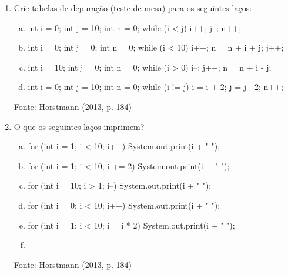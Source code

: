 \documentclass[onecolumn,a4paper,10pt]{report}
\newcommand{\+}{\, + \,}
\newcommand{\<}{\hspace*{-0.4cm}}
\begin{document}
\begin{enumerate}[1.]
\item Crie tabelas de depuração (teste de mesa) para os seguintes laços:
\begin{enumerate}[a)]
\item
\begin{javacode}
int i = 0; int j = 10; int n = 0;
while (i < j) { i++; j--; n++; }
\end{javacode}
\item
\begin{javacode}
int i = 0; int j = 0; int n = 0;
while (i < 10) { i++; n = n + i + j; j++; }
\end{javacode}
\item
\begin{javacode}
int i = 10; int j = 0; int n = 0;
while (i > 0) { i--; j++; n = n + i - j; }
\end{javacode}
\item
\begin{javacode}
int i = 0; int j = 10; int n = 0;
while (i != j) { i = i + 2; j = j - 2; n++; }
\end{javacode}
\end{enumerate}
{\tiny Fonte: Horstmann (2013, p. 184)}

\item O que os seguintes laços imprimem?
\begin{enumerate}[a)]
\item
\begin{javacode}
for (int i = 1; i < 10; i++) { System.out.print(i + " "); }
\end{javacode}
\item
\begin{javacode}
for (int i = 1; i < 10; i += 2) { System.out.print(i + " "); }
\end{javacode}
\item
\begin{javacode}
for (int i = 10; i > 1; i--) { System.out.print(i + " "); }
\end{javacode}
\item
\begin{javacode}
for (int i = 0; i < 10; i++) { System.out.print(i + " "); }
\end{javacode}
\item
\begin{javacode}
for (int i = 1; i < 10; i = i * 2) { System.out.print(i + " "); }
\end{javacode}
\item
{}
\end{enumerate}
{\tiny Fonte: Horstmann (2013, p. 184)}


\end{enumerate}
\end{document}
